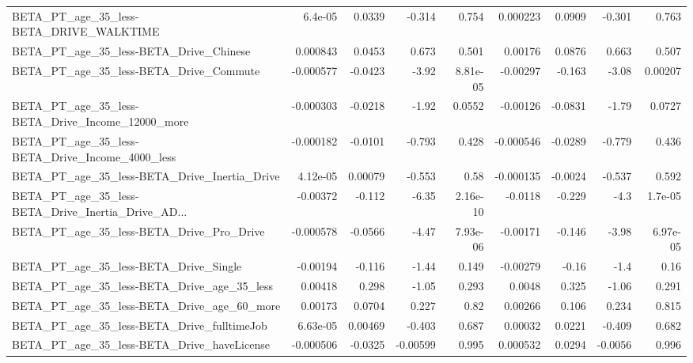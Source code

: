 \begin{tabular}{lrrrrrrrr}
BETA\_PT\_age\_35\_less-BETA\_DRIVE\_WALKTIME            &     6.4e-05 &       0.0339 &   -0.314 &    0.754 &   0.000223 &      0.0909 &       -0.301 &         0.763 \\
BETA\_PT\_age\_35\_less-BETA\_Drive\_Chinese             &    0.000843 &       0.0453 &    0.673 &    0.501 &    0.00176 &      0.0876 &        0.663 &         0.507 \\
BETA\_PT\_age\_35\_less-BETA\_Drive\_Commute             &   -0.000577 &      -0.0423 &    -3.92 & 8.81e-05 &   -0.00297 &      -0.163 &        -3.08 &       0.00207 \\
BETA\_PT\_age\_35\_less-BETA\_Drive\_Income\_12000\_more   &   -0.000303 &      -0.0218 &    -1.92 &   0.0552 &   -0.00126 &     -0.0831 &        -1.79 &        0.0727 \\
BETA\_PT\_age\_35\_less-BETA\_Drive\_Income\_4000\_less    &   -0.000182 &      -0.0101 &   -0.793 &    0.428 &  -0.000546 &     -0.0289 &       -0.779 &         0.436 \\
BETA\_PT\_age\_35\_less-BETA\_Drive\_Inertia\_Drive       &    4.12e-05 &      0.00079 &   -0.553 &     0.58 &  -0.000135 &     -0.0024 &       -0.537 &         0.592 \\
BETA\_PT\_age\_35\_less-BETA\_Drive\_Inertia\_Drive\_AD... &    -0.00372 &       -0.112 &    -6.35 & 2.16e-10 &    -0.0118 &      -0.229 &         -4.3 &       1.7e-05 \\
BETA\_PT\_age\_35\_less-BETA\_Drive\_Pro\_Drive           &   -0.000578 &      -0.0566 &    -4.47 & 7.93e-06 &   -0.00171 &      -0.146 &        -3.98 &      6.97e-05 \\
BETA\_PT\_age\_35\_less-BETA\_Drive\_Single              &    -0.00194 &       -0.116 &    -1.44 &    0.149 &   -0.00279 &       -0.16 &         -1.4 &          0.16 \\
BETA\_PT\_age\_35\_less-BETA\_Drive\_age\_35\_less         &     0.00418 &        0.298 &    -1.05 &    0.293 &     0.0048 &       0.325 &        -1.06 &         0.291 \\
BETA\_PT\_age\_35\_less-BETA\_Drive\_age\_60\_more         &     0.00173 &       0.0704 &    0.227 &     0.82 &    0.00266 &       0.106 &        0.234 &         0.815 \\
BETA\_PT\_age\_35\_less-BETA\_Drive\_fulltimeJob         &    6.63e-05 &      0.00469 &   -0.403 &    0.687 &    0.00032 &      0.0221 &       -0.409 &         0.682 \\
BETA\_PT\_age\_35\_less-BETA\_Drive\_haveLicense         &   -0.000506 &      -0.0325 & -0.00599 &    0.995 &   0.000532 &      0.0294 &      -0.0056 &         0.996 \\

\end{tabular}
